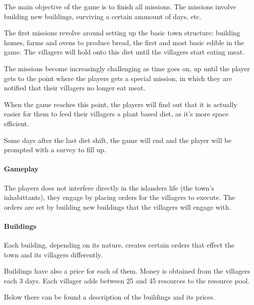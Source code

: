 The main objective of the game is to finish all missions. The missions
involve building new buildings, surviving a certain ammount of days, etc.

The first missions revolve around setting up the basic town structure:
building homes, farms and ovens to produce bread, the first and most
basic edible in the game. The villagers will hold onto this diet until
the villagers start eating meat.

The missions become increasingly challenging as time goes on, up
until the player gets to the point where the players gets a special
mission, in which they are notified that their villagers no longer eat meat.

When the game reaches this point, the players will find out that it is 
actually easier for them to feed their villagers a plant based diet, as
it's more space efficient.

Some days after the last diet shift, the game will end and the player
will be prompted with a survey to fill up.

\paragraph{Gameplay}

The players does not interfere directly in the islanders life (the
town's inhabittants), they engage by placing orders for the villagers
to execute. The orders are set by building new buildings that the villagers
will engage with.

\paragraph{Buildings}

Each building, depending on its nature, creates certain orders that effect
the town and its villagers differently.

Buildings have also a price for each of them. Money is obtained
from the villagers each 3 days. Each villager adds between 25 and 45
resources to the resource pool.

Below there can be found a description of the buildings
and its prices.

